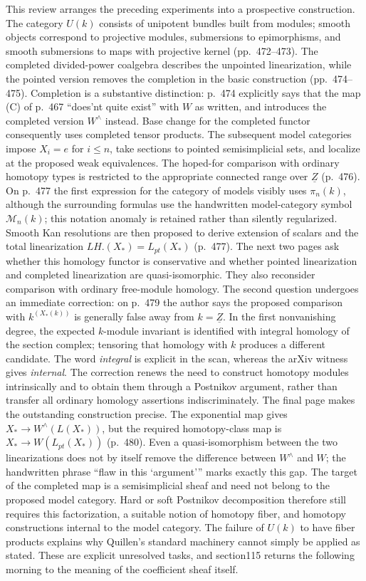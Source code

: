 \documentclass[10pt,oneside]{book}
\begin{document}
This review arranges the preceding experiments into a prospective construction. The category $U(k)$ consists of unipotent bundles built from modules; smooth objects correspond to projective modules, submersions to epimorphisms, and smooth submersions to maps with projective kernel (pp.~472--473). The completed divided-power coalgebra describes the unpointed linearization, while the pointed version removes the completion in the basic construction (pp.~474--475). Completion is a substantive distinction: p.~474 explicitly says that the map (C) of p.~467 ``does'nt quite exist'' with $W$ as written, and introduces the completed version $W^{\wedge}$ instead. Base change for the completed functor consequently uses completed tensor products. The subsequent model categories impose $X_i=e$ for $i\leq n$, take sections to pointed semisimplicial sets, and localize at the proposed weak equivalences. The hoped-for comparison with ordinary homotopy types is restricted to the appropriate connected range over $\underline Z$ (p.~476). On p.~477 the first expression for the category of models visibly uses $\pi_n(k)$, although the surrounding formulas use the handwritten model-category symbol $\mathcal M_n(k)$; this notation anomaly is retained rather than silently regularized. Smooth Kan resolutions are then proposed to derive extension of scalars and the total linearization $LH.(X_*)=L_{pt}(X_*)$ (p.~477). The next two pages ask whether this homology functor is conservative and whether pointed linearization and completed linearization are quasi-isomorphic. They also reconsider comparison with ordinary free-module homology. The second question undergoes an immediate correction: on p.~479 the author says the proposed comparison with $k^{(X_*(k))}$ is generally false away from $k=\underline Z$. In the first nonvanishing degree, the expected $k$-module invariant is identified with integral homology of the section complex; tensoring that homology with $k$ produces a different candidate. The word \emph{integral} is explicit in the scan, whereas the arXiv witness gives \emph{internal}. The correction renews the need to construct homotopy modules intrinsically and to obtain them through a Postnikov argument, rather than transfer all ordinary homology assertions indiscriminately. The final page makes the outstanding construction precise. The exponential map gives $X_*\to W^{\wedge}(L(X_*))$, but the required homotopy-class map is $X_*\to W(L_{pt}(X_*))$ (p.~480). Even a quasi-isomorphism between the two linearizations does not by itself remove the difference between $W^{\wedge}$ and $W$; the handwritten phrase ``flaw in this `argument''' marks exactly this gap. The target of the completed map is a semisimplicial sheaf and need not belong to the proposed model category. Hard or soft Postnikov decomposition therefore still requires this factorization, a suitable notion of homotopy fiber, and homotopy constructions internal to the model category. The failure of $U(k)$ to have fiber products explains why Quillen's standard machinery cannot simply be applied as stated. These are explicit unresolved tasks, and section115 returns the following morning to the meaning of the coefficient sheaf itself.
\end{document}
